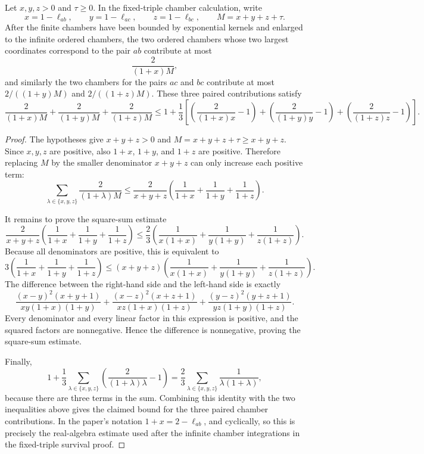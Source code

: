 \begin{helper}
Let $x,y,z>0$ and $\tau\ge0$.  In the fixed-triple chamber calculation,
write
\[
x=1-\ell_{ab},\qquad y=1-\ell_{ac},\qquad z=1-\ell_{bc},
\qquad M=x+y+z+\tau .
\]
After the finite chambers have been bounded by exponential kernels and
enlarged to the infinite ordered chambers, the two ordered chambers whose two
largest coordinates correspond to the pair $ab$ contribute at most
\[
\frac{2}{(1+x)M},
\]
and similarly the two chambers for the pairs $ac$ and $bc$ contribute at most
$2/((1+y)M)$ and $2/((1+z)M)$.  These three paired contributions satisfy
\[
\frac{2}{(1+x)M}+\frac{2}{(1+y)M}+\frac{2}{(1+z)M}
\le
1+\frac13\left[
\left(\frac{2}{(1+x)x}-1\right)
+\left(\frac{2}{(1+y)y}-1\right)
+\left(\frac{2}{(1+z)z}-1\right)
\right].
\]
\end{helper}
\begin{proof}
The hypotheses give $x+y+z>0$ and $M=x+y+z+\tau\ge x+y+z$.  Since
$x,y,z$ are positive, also $1+x$, $1+y$, and $1+z$ are positive.  Therefore
replacing $M$ by the smaller denominator $x+y+z$ can only increase each
positive term:
\[
\sum_{\lambda\in\{x,y,z\}}\frac{2}{(1+\lambda)M}
\le
\frac{2}{x+y+z}\left(\frac1{1+x}+\frac1{1+y}+\frac1{1+z}\right).
\]

It remains to prove the square-sum estimate
\[
\frac{2}{x+y+z}\left(\frac1{1+x}+\frac1{1+y}+\frac1{1+z}\right)
\le
\frac23\left(\frac1{x(1+x)}+\frac1{y(1+y)}+\frac1{z(1+z)}\right).
\]
Because all denominators are positive, this is equivalent to
\[
3\left(\frac1{1+x}+\frac1{1+y}+\frac1{1+z}\right)
\le
(x+y+z)\left(\frac1{x(1+x)}+\frac1{y(1+y)}
+\frac1{z(1+z)}\right).
\]
The difference between the right-hand side and the left-hand side is exactly
\[
\frac{(x-y)^2(x+y+1)}{xy(1+x)(1+y)}
+\frac{(x-z)^2(x+z+1)}{xz(1+x)(1+z)}
+\frac{(y-z)^2(y+z+1)}{yz(1+y)(1+z)} .
\]
Every denominator and every linear factor in this expression is positive,
and the squared factors are nonnegative.  Hence the difference is
nonnegative, proving the square-sum estimate.

Finally,
\[
1+\frac13\sum_{\lambda\in\{x,y,z\}}
\left(\frac{2}{(1+\lambda)\lambda}-1\right)
=\frac23\sum_{\lambda\in\{x,y,z\}}\frac1{\lambda(1+\lambda)},
\]
because there are three terms in the sum.  Combining this identity with the
two inequalities above gives the claimed bound for the three paired chamber
contributions.  In the paper's notation $1+x=2-\ell_{ab}$, and cyclically,
so this is precisely the real-algebra estimate used after the infinite
chamber integrations in the fixed-triple survival proof.
\end{proof}
